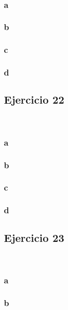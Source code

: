 \documentclass{article}
\begin{document}
\

\subsubsection*{a}

\subsubsection*{b}

\subsubsection*{c}

\subsubsection*{d}

\subsection*{Ejercicio 22}

\

\subsubsection*{a}

\subsubsection*{b}

\subsubsection*{c}

\subsubsection*{d}

\subsection*{Ejercicio 23}

\

\subsubsection*{a}

\subsubsection*{b}
\end{document}
